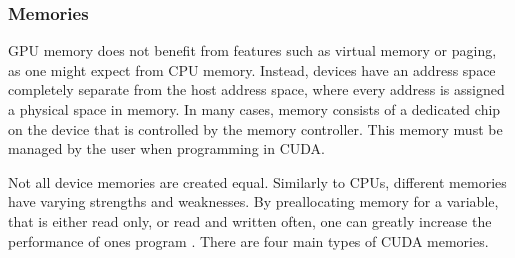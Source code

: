 \subsubsection{Memories}\label{sssec:memories}
GPU memory does not benefit from features such as virtual
memory or paging, as one might expect from CPU memory. Instead, devices have an
address space completely separate from the host address space, where every address is assigned a physical space in memory.
In many cases, memory consists of a dedicated chip on the device that is controlled
by the memory controller.  This memory must be managed by the user when programming in CUDA.
\par
Not all device memories are created equal.  Similarly to \glspl{CPU},
different memories have varying strengths and weaknesses.  By preallocating memory for a variable,
that is either read only, or read and written often, one can greatly increase the
performance of ones program \cite{Wilt}.   %
There are four main types of CUDA memories.
